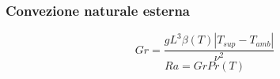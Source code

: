 \documentclass[a4paper,10pt]{article}                                                                                       %
\begin{document}
\subsubsection{Convezione naturale esterna}                                                                                 %
\label{subsubsec:ext_air_conv}                                                                                              %
\vspace{1mm}                                                                                                                %
\begin{equation}                                                                                                            %
  Gr = \frac{gL^3\beta(T)|T_{sup}-T_{amb}|}{\nu^2}                                                                          %
  \label{eqn:gr}                                                                                                            %
\end{equation}                                                                                                              %
\vspace{3mm}                                                                                                                %
\begin{equation}                                                                                                            %
  Ra = GrPr(T)                                                                                                              %
  \label{eqn:ra}                                                                                                            %
\end{equation}                                                                                                              %
\vspace{3mm}                                                                                                                %
\end{document}
